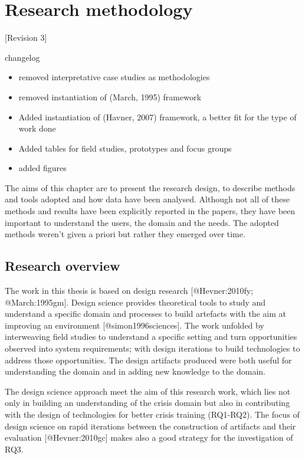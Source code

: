\section{Research methodology}\label{research-methodology}

{[}Revision 3{]}

changelog

\begin{itemize}
\itemsep1pt\parskip0pt
\item
  removed interpretative case studies as methodologies
\item
  removed instantiation of (March, 1995) framework
\item
  Added instantiation of (Havner, 2007) framework, a better fit for the
  type of work done
\item
  Added tables for field studies, prototypes and focus groups
\item
  added figures
\end{itemize}

The aims of this chapter are to present the research design, to describe
methods and tools adopted and how data have been analysed. Although not
all of these methods and results have been explicitly reported in the
papers, they have been important to understand the users, the domain and
the needs. The adopted methods weren't given a priori but rather they
emerged over time.

\subsection{Research overview}\label{research-overview}

The work in this thesis is based on design research {[}@Hevner:2010fy;
@March:1995gm{]}. Design science provides theoretical tools to study and
understand a specific domain and processes to build artefacts with the
aim at improving an environment {[}@simon1996sciences{]}. The work
unfolded by interweaving field studies to understand a specific setting
and turn opportunities observed into system requirements; with design
iterations to build technologies to address those opportunities. The
design artifacts produced were both useful for understanding the domain
and in adding new knowledge to the domain.

The design science approach meet the aim of this research work, which
lies not only in building an understanding of the crisis domain but also
in contributing with the design of technologies for better crisis
training (RQ1-RQ2). The focus of design science on rapid iterations
between the construction of artifacts and their evaluation
{[}@Hevner:2010gc{]} makes also a good strategy for the investigation of
RQ3.

